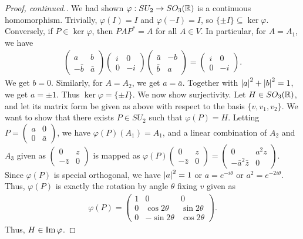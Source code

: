 \begin{proof}[Proof, continued.]
    We had shown $\varphi: SU_{2} \to SO_{3}(\mathbb{R})$ is a continuous homomorphism. Trivially, $\varphi(I) = I$ and $\varphi(-I) = I$, so $\{\pm I\} \subseteq \ker \varphi$. Conversely, if $P \in \ker \varphi$, then $PAP^{\ast} = A$ for all $A \in V$. In particular, for $A = A_{1}$, we have
    \begin{align}
        \begin{pmatrix}
            a & b \\ -\bar{b} & \bar{a}
        \end{pmatrix} \begin{pmatrix}
            i & 0 \\ 0 & -i
        \end{pmatrix} \begin{pmatrix}
            \bar{a} & -b \\ \bar{b} & a
        \end{pmatrix} = \begin{pmatrix}
            i & 0 \\ 0 & -i
        \end{pmatrix}.
    \end{align}
    We get $b = 0$. Similarly, for $A = A_{2}$, we get $a = \bar{a}$. Together with $\left| a \right|^{2} + \left| b \right|^{2} = 1$, we get $a = \pm 1$. Thus $\ker \varphi = \{\pm I\}$. We now show surjectivity. Let $H \in SO_{3}(\mathbb{R})$, and let its matrix form be given as above with respect to the basis $\{v,v_{1},v_{2}\}$. We want to show that there exists $P \in SU_{2}$ such that $\varphi(P) = H$. Letting $P = \begin{pmatrix}
        a & 0 \\ 0 & \bar{a}
    \end{pmatrix}$, we have $\varphi(P)(A_{1}) = A_{1}$, and a linear combination of $A_{2}$ and $A_{3}$ given as $\begin{pmatrix}
        0 & z \\ -\bar{z} & 0
    \end{pmatrix}$ is mapped as $\varphi(P) \begin{pmatrix}
        0 & z \\ -\bar{z} & 0
    \end{pmatrix} = \begin{pmatrix}
        0 & a^{2} z \\ -\bar{a}^{2} \bar{z} & 0
    \end{pmatrix}$. Since $\varphi(P)$ is special orthogonal, we have $\left| a \right|^{2} = 1$ or $a = e^{-i\theta}$ or $a^{2} = e^{-2i\theta}$. Thus, $\varphi(P)$ is exactly the rotation by angle $\theta$ fixing $v$ given as
    \begin{align}
        \varphi(P) = \begin{pmatrix}
            1 & 0 & 0 \\ 0 & \cos 2\theta & \sin 2\theta \\ 0 & -\sin 2\theta & \cos 2\theta
        \end{pmatrix}.
    \end{align}
    Thus, $H \in \operatorname{Im} \varphi$.
\end{proof}


